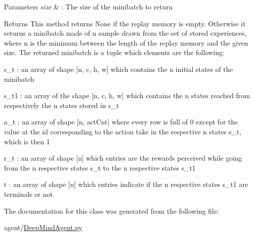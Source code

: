 \begin{DoxyParams}{Parameters}
{\em size} & \+: The size of the minibatch to return\\
\hline
\end{DoxyParams}
\begin{DoxyReturn}{Returns}
This method returns None if the replay memory is empty. Otherwise it returns a minibatch made of n sample drawn from the set of stored experiences, where \textquotesingle{}n\textquotesingle{} is the minimum between the length of the replay memory and the given size. The returned minibatch is a tuple which elements are the following\+:
\begin{DoxyItemize}
\item s\+\_\+t \+: an array of shape \mbox{[}n, c, h, w\mbox{]} which contains the n initial states of the minibatch
\item s\+\_\+t1 \+: an array of the shape \mbox{[}n, c, h, w\mbox{]} which contains the n states reached from respectively the n states stored in s\+\_\+t
\item a\+\_\+t \+: an array of shape \mbox{[}n, act\+Cnt\mbox{]} where every row is full of 0 except for the value at the id corresponding to the action take in the respective n states s\+\_\+t, which is then 1
\item r\+\_\+t \+: an array of shape \mbox{[}n\mbox{]} which entries are the rewards perceived while going from the n respective states s\+\_\+t to the n respective states s\+\_\+t1
\item t \+: an array of shape \mbox{[}n\mbox{]} which entries indicate if the n respective states s\+\_\+t1 are terminals or not 
\end{DoxyItemize}
\end{DoxyReturn}


The documentation for this class was generated from the following file\+:\begin{DoxyCompactItemize}
\item 
agent/\hyperlink{DeepMindAgent_8py}{Deep\+Mind\+Agent.\+py}\end{DoxyCompactItemize}
